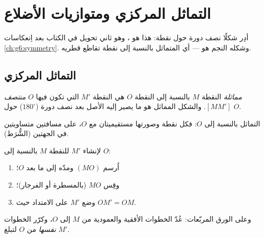 \chapter{التماثل المركزي ومتوازيات الأضلاع}\label{ch:g7:central}

أدِر شكلًا نصف دورة حول نقطة: هذا هو \emph{}، وهو ثاني تحويل في الكتاب بعد اِنعكاسات
\cref{ch:g6:symmetry}. وشكله النجم هو  ---
أي  المتماثل بالنسبة إلى نقطة تقاطع
قطريه.

\section{التماثل المركزي}

\begin{definition}\label{def:g7:central:def}
\emph{مماثلة} النقطة $M$ بالنسبة إلى
النقطة $O$ هي النقطة $M'$ التي تكون فيها $O$ \emph{منتصف}
 $[MM']$. والشكل المماثل هو ما يصير إليه الأصل بعد
نصف دورة ($180^\circ$) حول $O$.
\end{definition}

\begin{omfigure}

{\small التماثل بالنسبة إلى $O$: فكل نقطة وصورتها مستقيميتان مع
$O$، على مسافتين متساويتين في الجهتين (الشُّرَط).}
\end{omfigure}

\begin{method}\label{met:g7:central:construct}
لإنشاء  $M'$ للنقطة $M$ بالنسبة إلى $O$:
\begin{enumerate}
  \item اُرسم  $(MO)$ ومدّه إلى ما بعد $O$؛
  \item وقِس $MO$ (بالمسطرة أو الفرجار)؛
  \item وضع $M'$ على الامتداد حيث $OM' = OM$.
\end{enumerate}
وعلى الورق المربّعات: عُدّ الخطوات الأفقية والعمودية من $M$ إلى
$O$، وكرّر الخطوات \emph{نفسها} من $O$ لتبلغ $M'$.
\end{method}

